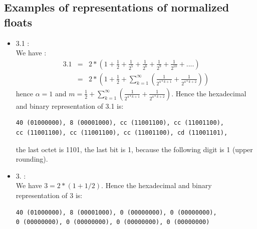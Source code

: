 \documentclass[a4paper,11pt]{book}
\begin{document}
\subsection{Examples of representations of normalized floats}
\begin{itemize}
\item 3.1 :\\
We have :
\begin{eqnarray*}
3.1&=&2*(1+\frac{1}{2}+\frac{1}{2^5}+\frac{1}{2^6}+
\frac{1}{2^9}+\frac{1}{2^{10}}+....)\\
&=&2*(1+\frac{1}{2}+\sum_{k=1}^\infty(\frac{1}{2^{4*k+1}}+\frac{1}{2^{4*k+2}}) ) 
\end{eqnarray*}
hence $\alpha=1$ and 
$m=\frac{1}{2}+\sum_{k=1}^\infty(\frac{1}{2^{4*k+1}}+\frac{1}{2^{4*k+2}})$.
Hence the hexadecimal and binary representation of 3.1 is:
\begin{verbatim}
40 (01000000), 8 (00001000), cc (11001100), cc (11001100), 
cc (11001100), cc (11001100), cc (11001100), cd (11001101),
\end{verbatim}
the last octet is 1101, the last bit is 1, because the
following digit is 1 (upper rounding).
\item  3. :\\
We have $3=2*(1+1/2)$.
Hence the hexadecimal and binary representation of 3 is:
\begin{verbatim}
40 (01000000), 8 (00001000), 0 (00000000), 0 (00000000), 
0 (00000000), 0 (00000000), 0 (00000000), 0 (00000000)
\end{verbatim}
\end{itemize}
\end{document}
